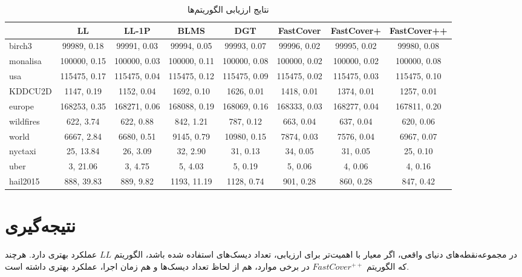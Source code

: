 \documentclass[12pt]{article}
\begin{document}
\begin{table}[H]
\centering
\singlespacing
\caption{
نتایج ارزیابی الگوریتم‌ها
} 
\label{tb:eval} 
\begin{latin}
\fontsize{8pt}{20pt}\selectfont
\begin{tabular}{|l|c|c|c|c|c|c|c|}
\hline
\multicolumn{1}{|c|}{\textbf{}} & LL & LL-1P & BLMS & DGT & FastCover & FastCover+ & FastCover++ \\ \hline
birch3 & 99989, 0.18 & 99991, 0.03 & 99994, 0.05 & 99993, 0.07 & 99996, 0.02 & 99995, 0.02 & 99980, 0.08 \\ \hline
monalisa & 100000, 0.15 & 100000, 0.03 & 100000, 0.11 & 100000, 0.08 & 100000, 0.02 & 100000, 0.02 & 100000, 0.08 \\ \hline
usa & 115475, 0.17 & 115475, 0.04 & 115475, 0.12 & 115475, 0.09 & 115475, 0.02 & 115475, 0.03 & 115475, 0.10 \\ \hline
KDDCU2D & 1147, 0.19 & 1152, 0.04 & 1692, 0.10 & 1626, 0.01 & 1418,    0.01 & 1374, 0.01 & 1257, 0.01 \\ \hline
europe & 168253, 0.35 & 168271, 0.06 & 168088, 0.19 & 168069, 0.16 & 168333, 0.03 & 168277, 0.04 & 167811, 0.20 \\ \hline
wildfires & 622, 3.74 & 622, 0.88 & 842, 1.21 & 787, 0.12 & 663, 0.04 & 637, 0.04 & 620, 0.06 \\ \hline
world & 6667, 2.84 & 6680, 0.51 & 9145, 0.79 & 10980, 0.15 & 7874, 0.03 & 7576, 0.04 & 6967, 0.07 \\ \hline
nyctaxi & 25, 13.84 & 26, 3.09 & 32, 2.90 & 31, 0.13 & 34, 0.05 & 31, 0.05 & 25, 0.10 \\ \hline
uber & 3, 21.06 & 3, 4.75 & 5, 4.03 & 5, 0.19 & 5, 0.06 & 4, 0.06 & 4, 0.16 \\ \hline
hail2015 & 888, 39.83 & 889, 9.82 & 1193, 11.19 & 1128, 0.74 & 901, 0.28 & 860, 0.28 & 847, 0.42 \\ \hline
\end{tabular}
\end{latin}
\end{table}


\section{نتیجه‌گیری}

در مجموعه‌نقطه‌های دنیای واقعی، اگر معیار با اهمیت‌تر برای ارزیابی، تعداد دیسک‌های استفاده شده باشد، الگوریتم $LL$ عملکرد بهتری دارد. هرچند که الگوریتم $FastCover^{++}$ در برخی موارد، هم از لحاظ تعداد دیسک‌ها و هم زمان اجرا، عملکرد بهتری داشته است.
\end{document}
